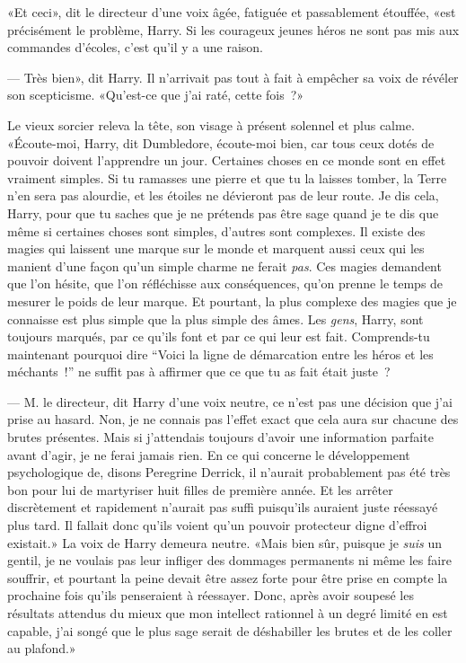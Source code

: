 «Et ceci», dit le directeur d'une voix âgée, fatiguée et passablement étouffée, «est précisément le problème, Harry. Si les courageux jeunes héros ne sont pas mis aux commandes d'écoles, c'est qu'il y a une raison.

--- Très bien», dit Harry. Il n'arrivait pas tout à fait à empêcher sa voix de révéler son scepticisme. «Qu'est-ce que j'ai raté, cette fois~?»

Le vieux sorcier releva la tête, son visage à présent solennel et plus calme. «Écoute-moi, Harry, dit Dumbledore, écoute-moi bien, car tous ceux dotés de pouvoir doivent l'apprendre un jour. Certaines choses en ce monde sont en effet vraiment simples. Si tu ramasses une pierre et que tu la laisses tomber, la Terre n'en sera pas alourdie, et les étoiles ne dévieront pas de leur route. Je dis cela, Harry, pour que tu saches que je ne prétends pas être sage quand je te dis que même si certaines choses sont simples, d'autres sont complexes. Il existe des magies qui laissent une marque sur le monde et marquent aussi ceux qui les manient d'une façon qu'un simple charme ne ferait \emph{pas}. Ces magies demandent que l'on hésite, que l'on réfléchisse aux conséquences, qu'on prenne le temps de mesurer le poids de leur marque. Et pourtant, la plus complexe des magies que je connaisse est plus simple que la plus simple des âmes. Les \emph{gens}, Harry, sont toujours marqués, par ce qu'ils font et par ce qui leur est fait. Comprends-tu maintenant pourquoi dire “Voici la ligne de démarcation entre les héros et les méchants~!” ne suffit pas à affirmer que ce que tu as fait était juste~?

--- M. le directeur, dit Harry d'une voix neutre, ce n'est pas une décision que j'ai prise au hasard. Non, je ne connais pas l'effet exact que cela aura sur chacune des brutes présentes. Mais si j'attendais toujours d'avoir une information parfaite avant d'agir, je ne ferai jamais rien. En ce qui concerne le développement psychologique de, disons Peregrine Derrick, il n'aurait probablement pas été très bon pour lui de martyriser huit filles de première année. Et les arrêter discrètement et rapidement n'aurait pas suffi puisqu'ils auraient juste réessayé plus tard. Il fallait donc qu'ils voient qu'un pouvoir protecteur digne d'effroi existait.» La voix de Harry demeura neutre. «Mais bien sûr, puisque je \emph{suis} un gentil, je ne voulais pas leur infliger des dommages permanents ni même les faire souffrir, et pourtant la peine devait être assez forte pour être prise en compte la prochaine fois qu'ils penseraient à réessayer. Donc, après avoir soupesé les résultats attendus du mieux que mon intellect rationnel à un degré limité en est capable, j'ai songé que le plus sage serait de déshabiller les brutes et de les coller au plafond.»

